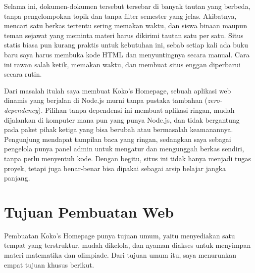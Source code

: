 \documentclass[12pt,a4paper]{article}
\begin{document}
	Selama ini, dokumen-dokumen tersebut tersebar di banyak tautan yang berbeda, tanpa pengelompokan topik dan tanpa filter semester yang jelas. Akibatnya, mencari satu berkas tertentu sering memakan waktu, dan siswa binaan maupun teman sejawat yang meminta materi harus dikirimi tautan satu per satu. Situs statis biasa pun kurang praktis untuk kebutuhan ini, sebab setiap kali ada buku baru saya harus membuka kode HTML dan menyuntingnya secara manual. Cara ini rawan salah ketik, memakan waktu, dan membuat situs enggan diperbarui secara rutin.

	Dari masalah itulah saya membuat Koko's Homepage, sebuah aplikasi web dinamis yang berjalan di Node.js murni tanpa pustaka tambahan (\textit{zero-dependency}). Pilihan tanpa dependensi ini membuat aplikasi ringan, mudah dijalankan di komputer mana pun yang punya Node.js, dan tidak bergantung pada paket pihak ketiga yang bisa berubah atau bermasalah keamanannya. Pengunjung mendapat tampilan baca yang ringan, sedangkan saya sebagai pengelola punya panel admin untuk mengatur dan mengunggah berkas sendiri, tanpa perlu menyentuh kode. Dengan begitu, situs ini tidak hanya menjadi tugas proyek, tetapi juga benar-benar bisa dipakai sebagai arsip belajar jangka panjang.
	
	\section{Tujuan Pembuatan Web}
	
	Pembuatan Koko's Homepage punya tujuan umum, yaitu menyediakan satu tempat yang terstruktur, mudah dikelola, dan nyaman diakses untuk menyimpan materi matematika dan olimpiade. Dari tujuan umum itu, saya menurunkan empat tujuan khusus berikut.
	
\end{document}
